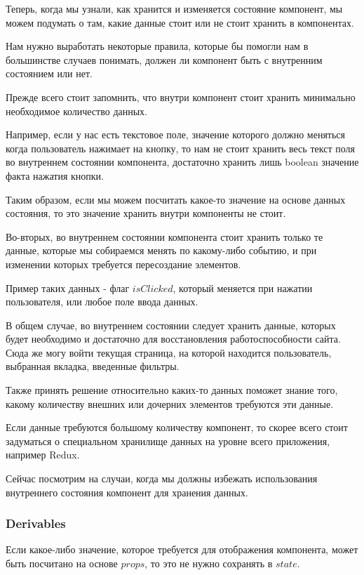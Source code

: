 Теперь, когда мы узнали, как хранится и изменяется состояние компонент, мы можем подумать о там, какие данные стоит или не стоит хранить в компонентах.

Нам нужно выработать некоторые правила, которые бы помогли нам в большинстве случаев понимать, должен ли компонент быть с внутренним состоянием или нет. 

Прежде всего стоит запомнить, что внутри компонент стоит хранить минимально необходимое количество данных.

Например, если у нас есть текстовое поле, значение которого должно меняться когда пользователь нажимает на кнопку, то нам не стоит хранить весь текст поля во внутреннем состоянии компонента, достаточно хранить лишь boolean значение факта нажатия кнопки.

Таким образом, если мы можем посчитать какое-то значение на основе данных состояния, то это значение хранить внутри компоненты не стоит.

Во-вторых, во внутреннем состоянии компонента стоит хранить только те данные, которые мы собираемся менять по какому-либо событию, и при изменении которых требуется пересоздание элементов. 

Пример таких данных - флаг $isClicked$, который меняется при нажатии пользователя, или любое поле ввода данных.

В общем случае, во внутреннем состоянии следует хранить данные, которых будет необходимо и достаточно для восстановления работоспособности сайта. Сюда же могу войти текущая страница, на которой находится пользователь, выбранная вкладка, введенные фильтры.

Также принять решение относительно каких-то данных поможет знание того, какому количеству внешних или дочерних элементов требуются эти данные.

Если данные требуются большому количеству компонент, то скорее всего стоит задуматься о специальном хранилище данных на уровне всего приложения, например Redux.

Сейчас посмотрим на случаи, когда мы должны избежать использования внутреннего состояния компонент для хранения данных.

\subsubsection{Derivables}

Если какое-либо значение, которое требуется для отображения компонента, может быть посчитано на основе $props$, то это не нужно сохранять в $state$.

